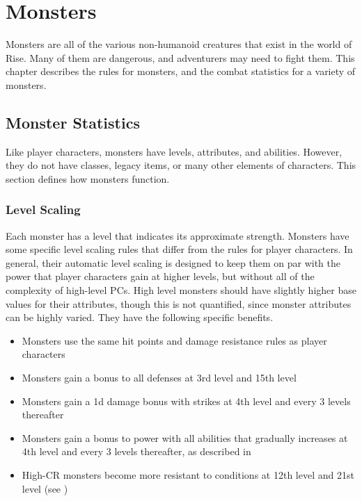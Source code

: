 \chapter{Monsters}

Monsters are all of the various non-humanoid creatures that exist in the world of Rise.
Many of them are dangerous, and adventurers may need to fight them.
This chapter describes the rules for monsters, and the combat statistics for a variety of monsters.

\section{Monster Statistics}
    Like player characters, monsters have levels, attributes, and abilities.
    However, they do not have classes, legacy items, or many other elements of characters.
    This section defines how monsters function.

    \subsection{Level Scaling}
        Each monster has a level that indicates its approximate strength.
        Monsters have some specific level scaling rules that differ from the rules for player characters.
        In general, their automatic level scaling is designed to keep them on par with the power that player characters gain at higher levels, but without all of the complexity of high-level PCs.
        High level monsters should have slightly higher base values for their attributes, though this is not quantified, since monster attributes can be highly varied.
        They have the following specific benefits.
        \begin{itemize}
            \item Monsters use the same hit points and damage resistance rules as player characters
            \item Monsters gain a  bonus to all defenses at 3rd level and 15th level
            \item Monsters gain a \plus1d damage bonus with strikes at 4th level and every 3 levels thereafter
            \item Monsters gain a  bonus to power with all abilities that gradually increases at 4th level and every 3 levels thereafter, as described in 
            \item High-CR monsters become more resistant to conditions at 12th level and 21st level (see )
        \end{itemize}


